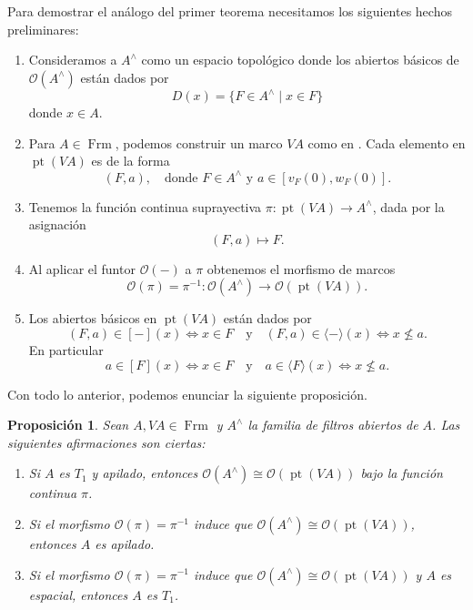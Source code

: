 \documentclass[12pt]{article}
\newtheorem{prop}[thm]{Proposición}
\DeclareMathOperator{\Frm}{Frm}
\DeclareMathOperator{\pt}{pt}
\begin{document}
Para demostrar el análogo del primer teorema necesitamos los siguientes hechos preliminares:
\begin{enumerate}
\item Consideramos a $A^\wedge$ como un espacio topológico donde los abiertos básicos de $\mathcal{O}(A^\wedge)$ están dados por 
\[
  D(x)=\{F\in A^\wedge\mid x\in F\}
\]
donde $x\in A$.
\item Para $A\in \Frm$, podemos construir un marco $VA$ como en \cite{simmons2004vietoris}. Cada elemento en $\pt(VA)$ es de la forma
\[
(F, a), \quad \text{donde } F\in A^\wedge \text{ y }a\in [v_F(0), w_F(0)]. 
\]
\item Tenemos la función continua suprayectiva $\pi\colon \pt(VA)\to A^\wedge$, dada por la asignación
\[
(F,a)\mapsto F.
\]
\item Al aplicar el funtor $\mathcal{O}(-)$ a $\pi$ obtenemos el morfismo de marcos
\[
\mathcal{O}(\pi)=\pi^{-1}\colon \mathcal{O}(A^\wedge)\to \mathcal{O}(\pt(VA)).
\]
\item Los abiertos básicos en $\pt(VA)$ están dados por 
\begin{equation}\label{fibra}
(F,a)\in [-](x)\iff x\in F\quad \text{y}\quad (F,a)\in \langle -\rangle(x)\iff x\nleq a.
\end{equation}
En particular
\begin{equation}\label{fibra2}
a\in [F](x)\iff x\in F\quad \text{y}\quad a\in \langle F\rangle(x)\iff x\nleq a.
\end{equation}
\end{enumerate}

Con todo lo anterior, podemos enunciar la siguiente proposición.

\begin{prop}
Sean $A, VA\in \Frm$ y $A^\wedge$ la familia de filtros abiertos de $A$. Las siguientes afirmaciones son ciertas:
\begin{enumerate}
\item Si $A$ es $T_1$ y apilado, entonces $\mathcal{O}(A^\wedge)\cong \mathcal{O}(\pt(VA))$ bajo la función continua $\pi$.
\item Si el morfismo $\mathcal{O}(\pi)=\pi^{-1}$ induce que $\mathcal{O}(A^\wedge)\cong \mathcal{O}(\pt(VA))$, entonces $A$ es apilado.
\item Si el morfismo $\mathcal{O}(\pi)=\pi^{-1}$ induce que $\mathcal{O}(A^\wedge)\cong \mathcal{O}(\pt(VA))$ y $A$ es espacial, entonces $A$ es $T_1$.
\end{enumerate}
\end{prop}
\end{document}
